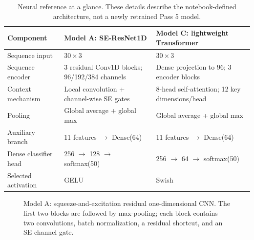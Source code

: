 \documentclass[conference]{IEEEtran}
\begin{document}
\begin{table}[t]
\centering
\caption{Neural reference at a glance. These details describe the notebook-defined architecture, not a newly retrained Pass 5 model.}
\label{tab:neural_overview}
\small
\begin{tabular}{p{}p{}p{}}
\toprule
Component & Model A: SE-ResNet1D & Model C: lightweight Transformer \\
\midrule
Sequence input & $30\times3$ & $30\times3$ \\
Sequence encoder & 3 residual Conv1D blocks; 96/192/384 channels & Dense projection to 96; 3 encoder blocks \\
Context mechanism & Local convolution + channel-wise SE gates & 8-head self-attention; 12 key dimensions/head \\
Pooling & Global average + global max & Global average + global max \\
Auxiliary branch & 11 features $\to$ Dense(64) & 11 features $\to$ Dense(64) \\
Dense classifier head & 256 $\to$ 128 $\to$ softmax(50) & 256 $\to$ 64 $\to$ softmax(50) \\
Selected activation & GELU & Swish \\
\bottomrule
\end{tabular}
\end{table}

\begin{figure}[t]
\centering
{}
\caption{Model A: squeeze-and-excitation residual one-dimensional CNN. The first two blocks are followed by max-pooling; each block contains two convolutions, batch normalization, a residual shortcut, and an SE channel gate.}
\label{fig:model_a}
\end{figure}
\end{document}
